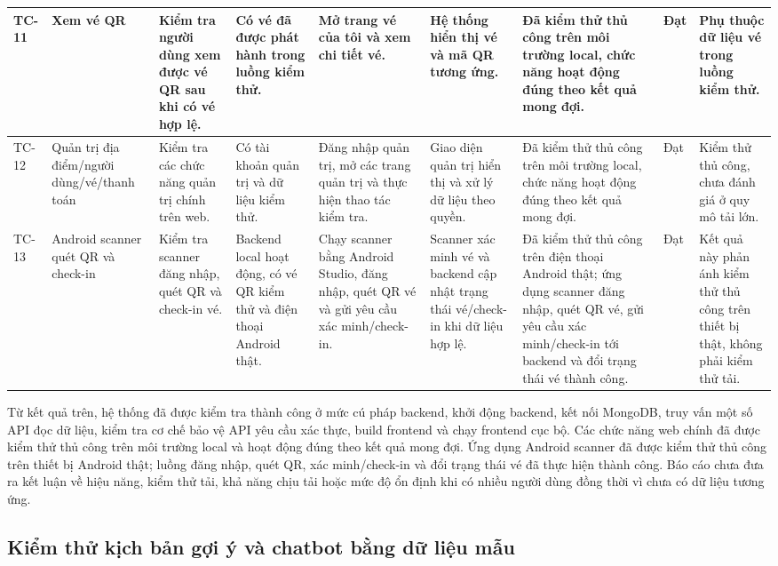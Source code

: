 ﻿\documentclass[../DoAn.tex]{subfiles}
\begin{document}
\begin{landscape}
\begin{longtable}{|L{1.2cm}|L{2.2cm}|L{2.6cm}|L{2.6cm}|L{3.2cm}|L{3.2cm}|L{3.4cm}|L{1.4cm}|L{2.2cm}|}
\hline
TC-11 & Xem vé QR & Kiểm tra người dùng xem được vé QR sau khi có vé hợp lệ. & Có vé đã được phát hành trong luồng kiểm thử. & Mở trang vé của tôi và xem chi tiết vé. & Hệ thống hiển thị vé và mã QR tương ứng. & Đã kiểm thử thủ công trên môi trường local, chức năng hoạt động đúng theo kết quả mong đợi. & Đạt & Phụ thuộc dữ liệu vé trong luồng kiểm thử. \\
\hline
TC-12 & Quản trị địa điểm/người dùng/vé/thanh toán & Kiểm tra các chức năng quản trị chính trên web. & Có tài khoản quản trị và dữ liệu kiểm thử. & Đăng nhập quản trị, mở các trang quản trị và thực hiện thao tác kiểm tra. & Giao diện quản trị hiển thị và xử lý dữ liệu theo quyền. & Đã kiểm thử thủ công trên môi trường local, chức năng hoạt động đúng theo kết quả mong đợi. & Đạt & Kiểm thử thủ công, chưa đánh giá ở quy mô tải lớn. \\
\hline
TC-13 & Android scanner quét QR và check-in & Kiểm tra scanner đăng nhập, quét QR và check-in vé. & Backend local hoạt động, có vé QR kiểm thử và điện thoại Android thật. & Chạy scanner bằng Android Studio, đăng nhập, quét QR vé và gửi yêu cầu xác minh/check-in. & Scanner xác minh vé và backend cập nhật trạng thái vé/check-in khi dữ liệu hợp lệ. & Đã kiểm thử thủ công trên điện thoại Android thật; ứng dụng scanner đăng nhập, quét QR vé, gửi yêu cầu xác minh/check-in tới backend và đổi trạng thái vé thành công. & Đạt & Kết quả này phản ánh kiểm thử thủ công trên thiết bị thật, không phải kiểm thử tải. \\
\hline
\end{longtable}
\end{landscape}

Từ kết quả trên, hệ thống đã được kiểm tra thành công ở mức cú pháp backend, khởi động backend, kết nối MongoDB, truy vấn một số API đọc dữ liệu, kiểm tra cơ chế bảo vệ API yêu cầu xác thực, build frontend và chạy frontend cục bộ. Các chức năng web chính đã được kiểm thử thủ công trên môi trường local và hoạt động đúng theo kết quả mong đợi. Ứng dụng Android scanner đã được kiểm thử thủ công trên thiết bị Android thật; luồng đăng nhập, quét QR, xác minh/check-in và đổi trạng thái vé đã thực hiện thành công. Báo cáo chưa đưa ra kết luận về hiệu năng, kiểm thử tải, khả năng chịu tải hoặc mức độ ổn định khi có nhiều người dùng đồng thời vì chưa có dữ liệu tương ứng.

\subsection{Kiểm thử kịch bản gợi ý và chatbot bằng dữ liệu mẫu}
\end{document}
